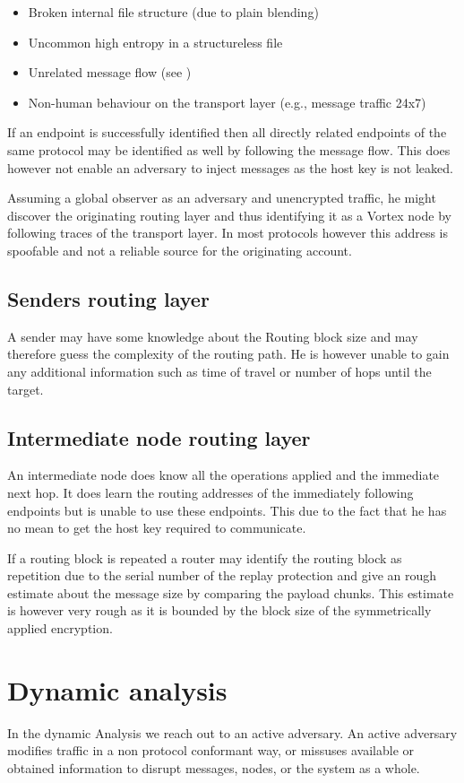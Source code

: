 \begin{itemize}
	\item Broken internal file structure (due to plain blending)
	\item Uncommon high entropy in a structureless file
	\item Unrelated message flow (see \cite{oakland2013-parrot})
	\item Non-human behaviour on the transport layer (e.g., message traffic 24x7)
\end{itemize}

If an endpoint is successfully identified then all directly related endpoints of the same protocol may be identified as well by following the message flow. This does however not enable an adversary to inject messages as the host key is not leaked. 

Assuming a global observer as an adversary and unencrypted traffic, he might discover the originating routing layer and thus identifying it as a Vortex node by following traces of the transport layer. In most protocols however this address is spoofable and not a reliable source for the originating account.

\section{Senders routing layer}
A sender may have some knowledge about the Routing block size and may therefore guess the complexity of the routing path. He is however unable to gain any additional information such as time of travel or number of hops until the target.

\section{Intermediate node routing layer}
An intermediate node does know all the operations applied and the immediate next hop. It does learn the routing addresses of the immediately following endpoints but is unable to use these endpoints. This due to the fact that he has no mean to get the host key required to communicate.

If a routing block is repeated a router may identify the routing block as repetition due to the serial number of the replay protection and give an rough estimate about the message size by comparing the payload chunks. This estimate is however very rough as it is bounded by the block size of the symmetrically applied encryption.

\chapter{Dynamic analysis}
In the dynamic Analysis we reach out to an active adversary. An active adversary modifies traffic in a non protocol conformant way, or missuses available or obtained information to disrupt messages, nodes, or the system as a whole.

